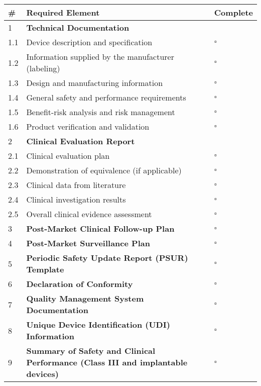 \begin{tcolorbox}[title=European MDR Documentation Checklist for Digital Health Applications]
\begin{tabular}{|p{1cm}|p{12cm}|p{1cm}|}
\hline
\textbf{\#} & \textbf{Required Element} & \textbf{Complete} \\
\hline
1 & \textbf{Technical Documentation} & \\
\hline
1.1 & Device description and specification & $\square$ \\
\hline
1.2 & Information supplied by the manufacturer (labeling) & $\square$ \\
\hline
1.3 & Design and manufacturing information & $\square$ \\
\hline
1.4 & General safety and performance requirements & $\square$ \\
\hline
1.5 & Benefit-risk analysis and risk management & $\square$ \\
\hline
1.6 & Product verification and validation & $\square$ \\
\hline
2 & \textbf{Clinical Evaluation Report} & \\
\hline
2.1 & Clinical evaluation plan & $\square$ \\
\hline
2.2 & Demonstration of equivalence (if applicable) & $\square$ \\
\hline
2.3 & Clinical data from literature & $\square$ \\
\hline
2.4 & Clinical investigation results & $\square$ \\
\hline
2.5 & Overall clinical evidence assessment & $\square$ \\
\hline
3 & \textbf{Post-Market Clinical Follow-up Plan} & $\square$ \\
\hline
4 & \textbf{Post-Market Surveillance Plan} & $\square$ \\
\hline
5 & \textbf{Periodic Safety Update Report (PSUR) Template} & $\square$ \\
\hline
6 & \textbf{Declaration of Conformity} & $\square$ \\
\hline
7 & \textbf{Quality Management System Documentation} & $\square$ \\
\hline
8 & \textbf{Unique Device Identification (UDI) Information} & $\square$ \\
\hline
9 & \textbf{Summary of Safety and Clinical Performance (Class III and implantable devices)} & $\square$ \\
\hline
\end{tabular}


\end{tcolorbox}
